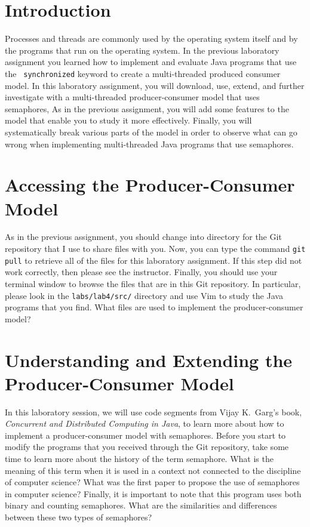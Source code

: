 


\usepackage[compact]{titlesec}


\section*{Introduction}

Processes and threads are commonly used by the operating system itself and by the programs that run on the operating
system. In the previous laboratory assignment you learned how to implement and evaluate Java programs that use the {\tt
  synchronized} keyword to create a multi-threaded produced consumer model. In this laboratory assignment, you will
download, use, extend, and further investigate with a multi-threaded producer-consumer model that uses semaphores,  As
in the previous assignment, you will add some features to the model that enable you to study it more effectively.
Finally, you will systematically break various parts of the model in order to observe what can go wrong when
implementing multi-threaded Java programs that use semaphores.

\section*{Accessing the Producer-Consumer Model}

As in the previous assignment, you should change into directory for the Git repository that I use to share files with
you. Now, you can type the command {\tt git pull} to retrieve all of the files for this laboratory assignment. If this
step did not work correctly, then please see the instructor.  Finally, you should use your terminal window to browse
the files that are in this Git repository.  In particular, please look in the {\tt labs/lab4/src/} directory and use Vim
to study the Java programs that you find. What files are used to implement the producer-consumer model?

\section*{Understanding and Extending the Producer-Consumer Model}

In this laboratory session, we will use code segments from Vijay K.\ Garg's book, {\em Concurrent and Distributed
  Computing in Java}, to learn more about how to implement a producer-consumer model with semaphores.  Before you start
to modify the programs that you received through the Git repository, take some time to learn more about the history of
the term semaphore.  What is the meaning of this term when it is used in a context not connected to the discipline of
computer science? What was the first paper to propose the use of semaphores in computer science? Finally, it is
important to note that this program uses both binary and counting semaphores. What are the similarities and differences
between these two types of semaphores?

